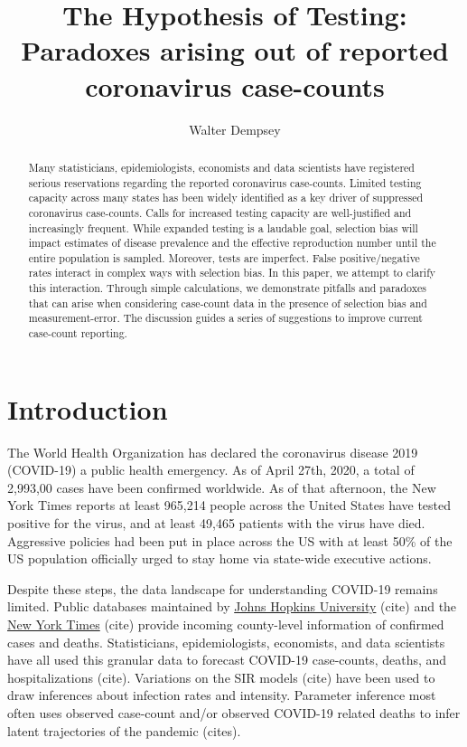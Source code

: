 \documentclass[aoas]{amsart}
\begin{document}
\title[The Hypothesis of Testing]{The Hypothesis of Testing: Paradoxes arising out of reported coronavirus case-counts} %

\author{Walter Dempsey}
\address{Department of Biostatistics, University of Michigan, Ann Arbor, MI 48109}

\begin{abstract}
Many statisticians, epidemiologists, economists and data scientists have registered serious reservations regarding the reported coronavirus case-counts. Limited testing capacity across many states has been widely identified as a key driver of suppressed coronavirus case-counts.  Calls for increased testing capacity are well-justified and increasingly frequent.  While expanded testing is a laudable goal, selection bias will impact estimates of disease prevalence and the effective reproduction number until the entire population is sampled.  Moreover, tests are imperfect.  False positive/negative rates interact in complex ways with selection bias.  In this paper, we attempt to clarify this interaction.  Through simple calculations, we demonstrate pitfalls and paradoxes that can arise when considering case-count data in the presence of selection bias and measurement-error. The discussion guides a series of suggestions to improve current case-count reporting.
\end{abstract}

\maketitle

\section{Introduction}
The World Health Organization has declared the coronavirus disease 2019 (COVID-19) a public health emergency.  As of April 27th, 2020, a total of 2,993,00 cases have been confirmed worldwide.  As of that afternoon, the New York Times reports at least 965,214 people across the United States have tested positive for the virus, and at least 49,465 patients with the virus have died.  Aggressive policies had been put in place across the US with at least 50\% of the US population officially urged to stay home via state-wide executive actions.

Despite these steps, the data landscape for understanding COVID-19 remains limited.  Public databases maintained by \href{https://bit.ly/2UqFSuA}{Johns Hopkins University} (cite) and the \href{https://bit.ly/2vUHfrK}{New York Times} (cite) provide incoming county-level information of confirmed cases and deaths.  Statisticians, epidemiologists, economists, and data scientists have all used this granular data to forecast COVID-19 case-counts, deaths, and hospitalizations (cite).  Variations on the SIR models (cite) have been used to draw inferences about infection rates and intensity.  Parameter inference most often uses observed case-count and/or observed COVID-19 related deaths to infer latent trajectories of the pandemic (cites).
\end{document}
